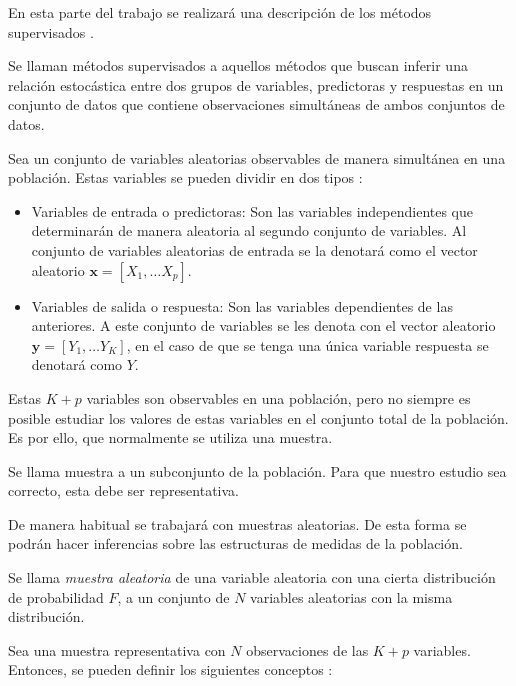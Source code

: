 \noindent En esta parte del trabajo se realizará una descripción de los métodos supervisados \cite{Mahesh 2020}. 
\begin{defi}
Se llaman métodos supervisados  a aquellos métodos que buscan inferir una relación estocástica entre dos grupos de variables, predictoras y respuestas en un conjunto de datos que contiene observaciones simultáneas de ambos conjuntos de datos. 
\end{defi}
\noindent Sea un conjunto de variables aleatorias observables de manera simultánea en una población. Estas variables se pueden dividir en dos tipos \cite{Hastie 2001}:
\begin{itemize}
\item Variables de entrada o predictoras: Son las variables independientes que determinarán de manera aleatoria al segundo conjunto de variables. Al conjunto de variables aleatorias de entrada se la denotará como el vector aleatorio $\textbf{x}=[X_1,\ldots X_p]$.

\item Variables de salida o respuesta: Son las variables dependientes de las anteriores. A este conjunto de variables se les denota con el vector aleatorio $\textbf{y}=[Y_1,\ldots Y_K]$, en el caso de que se tenga una única variable respuesta se denotará como $Y$. 
\end{itemize}

\noindent Estas $K+p$ variables son observables en una población, pero no siempre es posible estudiar los valores de estas variables en el conjunto total de la población. Es por ello, que normalmente se utiliza una muestra. 

\begin{defi}
Se llama muestra a un subconjunto de la población. Para que nuestro estudio sea correcto, esta debe ser representativa.
\end{defi}

\noindent De manera habitual se trabajará con muestras aleatorias.  De esta forma se podrán hacer inferencias sobre las estructuras de medidas de la población. 

\begin{defi}
Se llama \emph{muestra aleatoria} de una variable aleatoria con una cierta distribución de probabilidad $F$, a un conjunto de $N$ variables aleatorias con la misma distribución. 
\end{defi} 

\noindent Sea una muestra representativa con $N$ observaciones de las $K+p$ variables. Entonces, se pueden definir los siguientes conceptos \cite{Chatfield 1989}:

